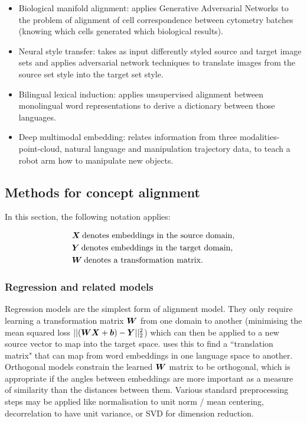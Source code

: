 \begin{itemize}
    \item Biological manifold alignment: \cite{magan} applies Generative Adversarial Networks \cite{GAN} to the problem of alignment of cell correspondence between cytometry batches (knowing which cells generated which biological results). 
    \item Neural style transfer: \cite{CycleGAN} takes as input differently styled source and target image sets and applies adversarial network techniques to translate images from the source set style into the target set style. 
    \item Bilingual lexical induction: \cite{wordtranslationwithoutparalleldata} applies unsupervised alignment between monolingual word representations to derive a dictionary between those languages.
    \item Deep multimodal embedding: \cite{DeepMultimodalEmbedding} relates information from three modalities- point-cloud, natural language and manipulation trajectory data, to teach a robot arm  how to manipulate new objects. 
\end{itemize}

\subsection{Methods for concept alignment}

In this section, the following notation applies:

\begin{equation*}
\begin{split}
    &\boldsymbol{X} \medspace \text{denotes embeddings in the source domain},\\
    &\boldsymbol{Y} \medspace \text{denotes embeddings in the target domain},\\
    &\boldsymbol{W} \medspace \text{denotes a transformation matrix}.\\
\end{split}
\end{equation*}

\subsubsection{Regression and related models}

Regression models are the simplest form of alignment model. They only require learning a transformation matrix $\boldsymbol{W}$ from one domain to another (minimising the mean squared loss $|| (\boldsymbol{W} \boldsymbol{X} + \boldsymbol{b}) - \boldsymbol{Y}||_2^2$) which can then be applied to a new source vector to map into the target space. \cite{MikolovMachineTranslation} uses this to find a ``translation matrix" that can map from word embeddings in one language space to another. Orthogonal models constrain the learned $\boldsymbol{W}$ matrix to be orthogonal, which is appropriate if the angles between embeddings are more important as a measure of similarity than the distances between them. Various standard preprocessing steps may be applied like normalisation to unit norm / mean centering, decorrelation to have unit variance, or SVD for dimension reduction.

